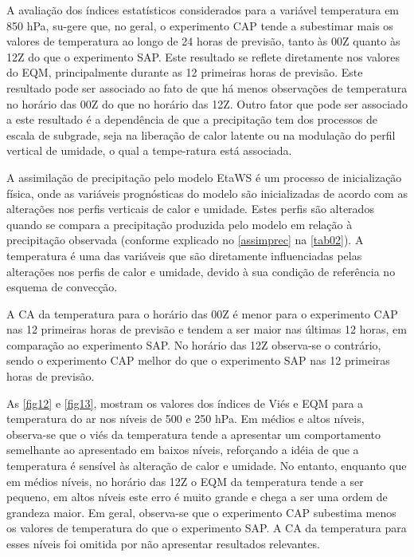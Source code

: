 A avaliação dos índices estatísticos considerados para a variável temperatura em 850 hPa, su-gere que, no geral, o experimento CAP tende a subestimar mais os valores de temperatura ao longo de 24 horas de previsão, tanto às 00Z quanto às 12Z do que o experimento SAP. Este resultado se reflete diretamente nos valores do EQM, principalmente durante as 12 primeiras horas de previsão. Este resultado pode ser associado ao fato de que há menos observações de temperatura no horário das 00Z do que no horário das 12Z. Outro fator que pode ser associado a este resultado é a dependência de que a precipitação tem dos processos de escala de subgrade, seja na liberação de calor latente ou na modulação do perfil vertical de umidade, o qual a tempe-ratura está associada.

A assimilação de precipitação pelo modelo EtaWS é um processo de inicialização física, onde as variáveis prognósticas do modelo são inicializadas de acordo com as alterações nos perfis verticais de calor e umidade. Estes perfis são alterados quando se compara a precipitação produzida pelo modelo em relação à precipitação observada (conforme explicado no \autoref{assimprec} na \autoref{tab02}). A temperatura é uma das variáveis que são diretamente influenciadas pelas alterações nos perfis de calor e umidade, devido à sua condição de referência no esquema de convecção. 

A CA da temperatura para o horário das 00Z é menor para o experimento CAP nas 12 primeiras horas de previsão e tendem a ser maior nas últimas 12 horas, em comparação ao experimento SAP. No horário das 12Z observa-se o contrário, sendo o experimento CAP melhor do que o experimento SAP nas 12 primeiras horas de previsão.

As \autoref{fig12} e \autoref{fig13}, mostram os valores dos índices de Viés e EQM para a temperatura do ar nos níveis de 500 e 250 hPa. Em médios e altos níveis, observa-se que o viés da temperatura tende a apresentar um comportamento semelhante ao apresentado em baixos níveis, reforçando a idéia de que a temperatura é sensível às alteração de calor e umidade. No entanto, enquanto que em médios níveis, no horário das 12Z o EQM da temperatura tende a ser pequeno, em altos níveis este erro é muito grande e chega a ser uma ordem de grandeza maior. Em geral, observa-se que o experimento CAP subestima menos os valores de temperatura do que o experimento SAP. A CA da temperatura para esses níveis foi omitida por não apresentar resultados relevantes.
 	 
